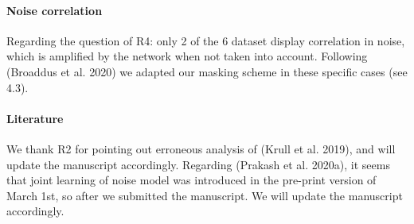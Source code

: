 \documentclass{article}
\begin{document}
\paragraph{Noise correlation}
Regarding the question of R4: only 2 of the 6 dataset display correlation in noise, which is amplified by the network when not taken into account.
Following (Broaddus et al. 2020) we adapted our masking scheme in these specific cases (see 4.3).

\paragraph{Literature}
We thank R2 for pointing out erroneous analysis of (Krull et al. 2019), and will update the manuscript accordingly.
Regarding (Prakash et al. 2020a), it seems that joint learning of noise model was introduced in the pre-print version of March 1st, so after we submitted the manuscript. We will update the manuscript accordingly.
\end{document}
